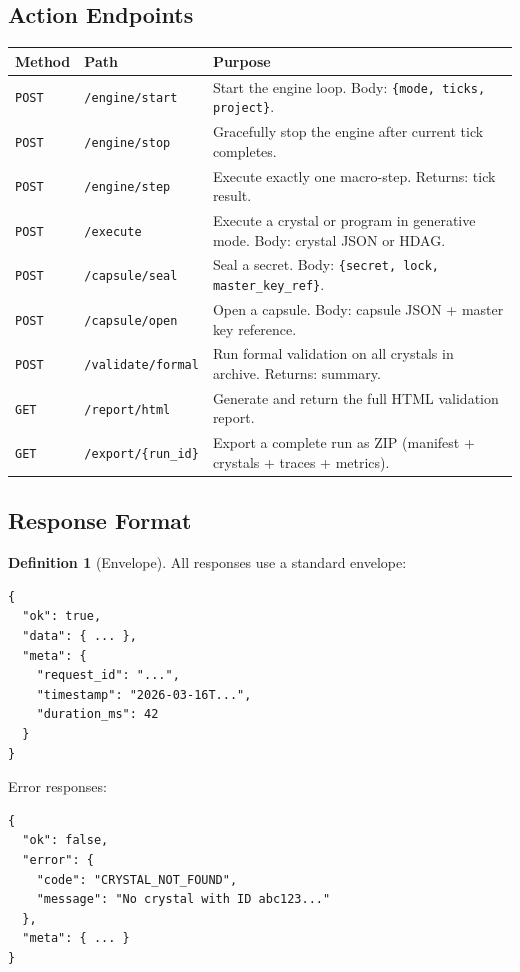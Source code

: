 \documentclass[11pt,a4paper,twoside]{article}
\theoremstyle{definition}
\newtheorem{definition}{Definition}[section]
\theoremstyle{plain}
\theoremstyle{remark}
\begin{document}
\subsection{Action Endpoints}

\begin{longtable}{l l p{6.5cm}}
\toprule
\textbf{Method} & \textbf{Path} & \textbf{Purpose} \\
\midrule
\endfirsthead
\midrule
\endhead
\bottomrule
\endfoot
\texttt{POST} & \texttt{/engine/start} & Start the engine loop.
  Body: \texttt{\{mode, ticks, project\}}. \\
\texttt{POST} & \texttt{/engine/stop} & Gracefully stop the engine
  after current tick completes. \\
\texttt{POST} & \texttt{/engine/step} & Execute exactly one
  macro-step. Returns: tick result. \\
\texttt{POST} & \texttt{/execute} & Execute a crystal or program in
  generative mode. Body: crystal JSON or HDAG. \\
\texttt{POST} & \texttt{/capsule/seal} & Seal a secret. Body:
  \texttt{\{secret, lock, master\_key\_ref\}}. \\
\texttt{POST} & \texttt{/capsule/open} & Open a capsule. Body:
  capsule JSON + master key reference. \\
\texttt{POST} & \texttt{/validate/formal} & Run formal validation on
  all crystals in archive. Returns: summary. \\
\texttt{GET} & \texttt{/report/html} & Generate and return the full
  HTML validation report. \\
\texttt{GET} & \texttt{/export/\{run\_id\}} & Export a complete run as
  ZIP (manifest + crystals + traces + metrics). \\
\end{longtable}

\subsection{Response Format}

\begin{definition}[Envelope]\label{def:envelope}
All responses use a standard envelope:
\begin{lstlisting}
{
  "ok": true,
  "data": { ... },
  "meta": {
    "request_id": "...",
    "timestamp": "2026-03-16T...",
    "duration_ms": 42
  }
}
\end{lstlisting}
Error responses:
\begin{lstlisting}
{
  "ok": false,
  "error": {
    "code": "CRYSTAL_NOT_FOUND",
    "message": "No crystal with ID abc123..."
  },
  "meta": { ... }
}
\end{lstlisting}
\end{definition}
\end{document}
